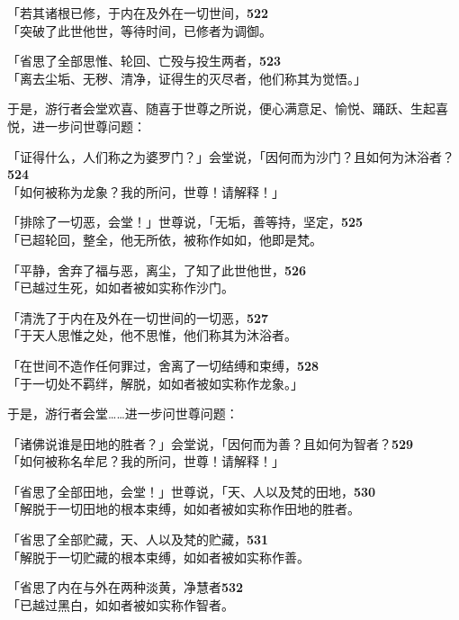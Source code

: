 「若其诸根已修，于内在及外在一切世间，\hfill{\grayfootnotesize \textbf{522}} \\
「突破了此世他世，等待时间，已修者为调御。


「省思了全部思惟、轮回、亡殁与投生两者，\hfill{\grayfootnotesize \textbf{523}} \\
「离去尘垢、无秽、清净，证得生的灭尽者，他们称其为觉悟。」


于是，游行者会堂欢喜、随喜于世尊之所说，便心满意足、愉悦、踊跃、生起喜悦，进一步问世尊问题：

「证得什么，人们称之为婆罗门？」会堂说，「因何而为沙门？且如何为沐浴者？\hfill{\grayfootnotesize \textbf{524}} \\
「如何被称为龙象？我的所问，世尊！请解释！」

「排除了一切恶，会堂！」世尊说，「无垢，善等持，坚定，\hfill{\grayfootnotesize \textbf{525}} \\
「已超轮回，整全，他无所依，被称作如如，他即是梵。


「平静，舍弃了福与恶，离尘，了知了此世他世，\hfill{\grayfootnotesize \textbf{526}} \\
「已越过生死，如如者被如实称作沙门。


「清洗了于内在及外在一切世间的一切恶，\hfill{\grayfootnotesize \textbf{527}} \\
「于天人思惟之处，他不思惟，他们称其为沐浴者。


「在世间不造作任何罪过，舍离了一切结缚和束缚，\hfill{\grayfootnotesize \textbf{528}} \\
「于一切处不羁绊，解脱，如如者被如实称作龙象。」


于是，游行者会堂……进一步问世尊问题：

「诸佛说谁是田地的胜者？」会堂说，「因何而为善？且如何为智者？\hfill{\grayfootnotesize \textbf{529}} \\
「如何被称名牟尼？我的所问，世尊！请解释！」

「省思了全部田地，会堂！」世尊说，「天、人以及梵的田地，\hfill{\grayfootnotesize \textbf{530}} \\
「解脱于一切田地的根本束缚，如如者被如实称作田地的胜者。


「省思了全部贮藏，天、人以及梵的贮藏，\hfill{\grayfootnotesize \textbf{531}} \\
「解脱于一切贮藏的根本束缚，如如者被如实称作善。


「省思了内在与外在两种淡黄，净慧者\hfill{\grayfootnotesize \textbf{532}} \\
「已越过黑白，如如者被如实称作智者。


